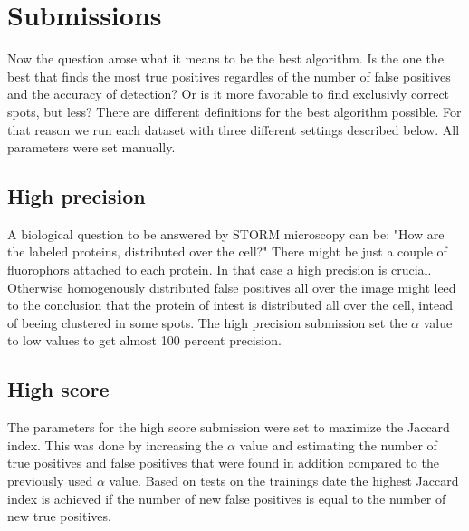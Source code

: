 \section{Submissions}
Now the question arose what it means to be the best algorithm. Is the one the best that finds the most true positives regardles of the number of false positives and the accuracy of detection? Or is it more favorable to find exclusivly correct spots, but less? There are different definitions for the best algorithm possible.\newline
For that reason we run each dataset with three different settings described below. All parameters were set manually.
\subsection{High precision}
A biological question to be answered by STORM microscopy can be: "How are the labeled proteins, distributed over the cell?" There might be just a couple of fluorophors attached to each protein. In that case a high precision is crucial. Otherwise homogenously distributed false positives all over the image might leed to the conclusion that the protein of intest is distributed all over the cell, intead of beeing clustered in some spots.\newline
The high precision submission set the $\alpha$ value to low values to get almost 100 percent precision.
\subsection{High score}
The parameters for the high score submission were set to maximize the Jaccard index. This was done by increasing the $\alpha$ value and estimating the number of true positives and false positives that were found in addition compared to the previously used $\alpha$ value. Based on tests on the trainings date the highest Jaccard index is achieved if the number of new false positives is equal to the number of new true positives. 
